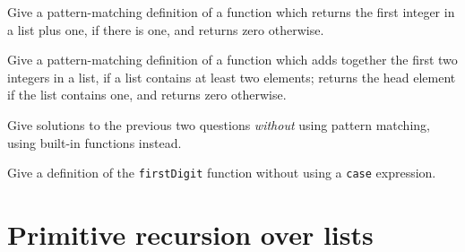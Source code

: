 

\begin{exercises}


\item
Give a pattern-matching definition of a function which returns the
first integer in a list plus one, if there is one, and returns zero otherwise.

\item
Give a pattern-matching definition of a function which adds together the
first two integers in a list, if a list contains at least two elements;
returns the head element if the list contains one, and returns zero
otherwise.

\item 
Give solutions to the previous two questions {\em without\/} using
pattern matching, using built-in functions instead.

\item
Give a definition of the \texttt{firstDigit} function without using a \texttt{case} expression.

\end{exercises}
\section{Primitive recursion over lists}

